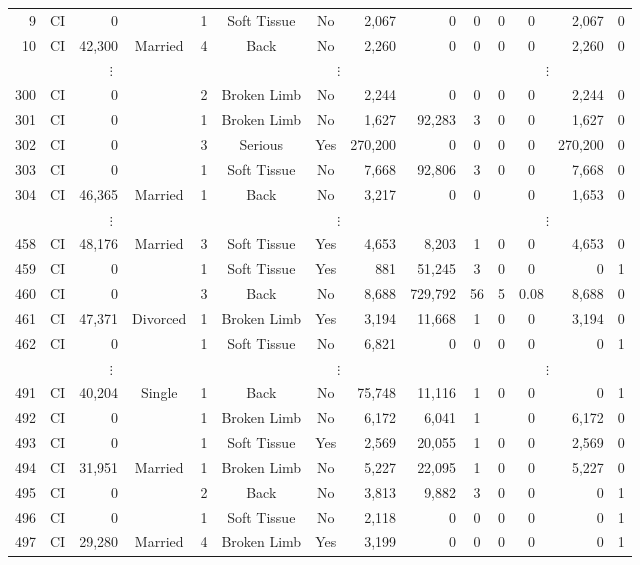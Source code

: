 \documentclass[xcolor={table}]{beamer}
\begin{document}
\begin{frame} [plain]
\begin{table}[tb]
\begin{tiny}
{\begin{tabular}{ r c r c c c c r r c c c r c}
9	&	CI	&	0	&		&	1	&	Soft Tissue	&	No	&	2,067	&	0	&	0	&	0	&	0	&	2,067	&	0	\\
10	&	CI	&	42,300	&	Married	&	4	&	Back	&	No	&	2,260	&	0	&	0	&	0	&	0	&	2,260	&	0	\\
\multicolumn{5}{c}{$\vdots$} & \multicolumn{4}{c}{$\vdots$} & \multicolumn{5}{c}{$\vdots$} \\
300	&	CI	&	0	&		&	2	&	Broken Limb	&	No	&	2,244	&	0	&	0	&	0	&	0	&	2,244	&	0	\\
301	&	CI	&	0	&		&	1	&	Broken Limb	&	No	&	1,627	&	92,283	&	3	&	0	&	0	&	1,627	&	0	\\
302	&	CI	&	0	&		&	3	&	Serious	&	Yes	&	270,200	&	0	&	0	&	0	&	0	&	270,200	&	0	\\
303	&	CI	&	0	&		&	1	&	Soft Tissue	&	No	&	7,668	&	92,806	&	3	&	0	&	0	&	7,668	&	0	\\
304	&	CI	&	46,365	&	Married	&	1	&	Back	&	No	&	3,217	&	0	&	0	&		&	0	&	1,653	&	0	\\
\multicolumn{5}{c}{$\vdots$} & \multicolumn{4}{c}{$\vdots$} & \multicolumn{5}{c}{$\vdots$} \\
458	&	CI	&	48,176	&	Married	&	3	&	Soft Tissue	&	Yes	&	4,653	&	8,203	&	1	&	0	&	0	&	4,653	&	0	\\
459	&	CI	&	0	&		&	1	&	Soft Tissue	&	Yes	&	881	&	51,245	&	3	&	0	&	0	&	0	&	1	\\
460	&	CI	&	0	&		&	3	&	Back	&	No	&	8,688	&	729,792	&	56	&	5	&	0.08	&	8,688	&	0	\\
461	&	CI	&	47,371	&	Divorced	&	1	&	Broken Limb	&	Yes	&	3,194	&	11,668	&	1	&	0	&	0	&	3,194	&	0	\\
462	&	CI	&	0	&		&	1	&	Soft Tissue	&	No	&	6,821	&	0	&	0	&	0	&	0	&	0	&	1	\\
\multicolumn{5}{c}{$\vdots$} & \multicolumn{4}{c}{$\vdots$} & \multicolumn{5}{c}{$\vdots$} \\
491	&	CI	&	40,204	&	Single	&	1	&	Back	&	No	&	75,748	&	11,116	&	1	&	0	&	0	&	0	&	1	\\
492	&	CI	&	0	&		&	1	&	Broken Limb	&	No	&	6,172	&	6,041	&	1	&		&	0	&	6,172	&	0	\\
493	&	CI	&	0	&		&	1	&	Soft Tissue	&	Yes	&	2,569	&	20,055	&	1	&	0	&	0	&	2,569	&	0	\\
494	&	CI	&	31,951	&	Married	&	1	&	Broken Limb	&	No	&	5,227	&	22,095	&	1	&	0	&	0	&	5,227	&	0	\\
495	&	CI	&	0	&		&	2	&	Back	&	No	&	3,813	&	9,882	&	3	&	0	&	0	&	0	&	1	\\
496	&	CI	&	0	&		&	1	&	Soft Tissue	&	No	&	2,118	&	0	&	0	&	0	&	0	&	0	&	1	\\
497	&	CI	&	29,280	&	Married	&	4	&	Broken Limb	&	Yes	&	3,199	&	0	&	0	&	0	&	0	&	0	&	1	\\

\end{tabular}}
\end{tiny}
\end{table}
\end{frame}
\end{document}
